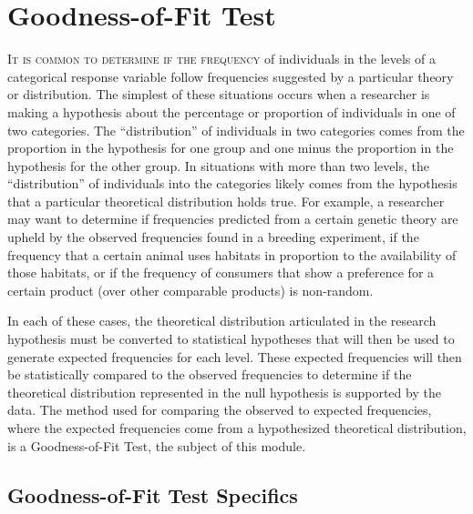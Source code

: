 \documentclass[10pt,openany]{book}\usepackage[]{graphicx}\usepackage[]{color}
\begin{document}
\chapter[Goodness-of-Fit]{Goodness-of-Fit Test} \label{chap:GOF}

\vspace{36pt}
\minitoc
\vspace{36pt}

\lettrine{I}{t is common to determine if the frequency} of individuals in the levels of a categorical response variable follow frequencies suggested by a particular theory or distribution. The simplest of these situations occurs when a researcher is making a hypothesis about the percentage or proportion of individuals in one of two categories. The ``distribution'' of individuals in two categories comes from the proportion in the hypothesis for one group and one minus the proportion in the hypothesis for the other group. In situations with more than two levels, the ``distribution'' of individuals into the categories likely comes from the hypothesis that a particular theoretical distribution holds true. For example, a researcher may want to determine if frequencies predicted from a certain genetic theory are upheld by the observed frequencies found in a breeding experiment, if the frequency that a certain animal uses habitats in proportion to the availability of those habitats, or if the frequency of consumers that show a preference for a certain product (over other comparable products) is non-random.

In each of these cases, the theoretical distribution articulated in the research hypothesis must be converted to statistical hypotheses that will then be used to generate expected frequencies for each level. These expected frequencies will then be statistically compared to the observed frequencies to determine if the theoretical distribution represented in the null hypothesis is supported by the data. The method used for comparing the observed to expected frequencies, where the expected frequencies come from a hypothesized theoretical distribution, is a Goodness-of-Fit Test, the subject of this module.

\section{Goodness-of-Fit Test Specifics}
\end{document}
